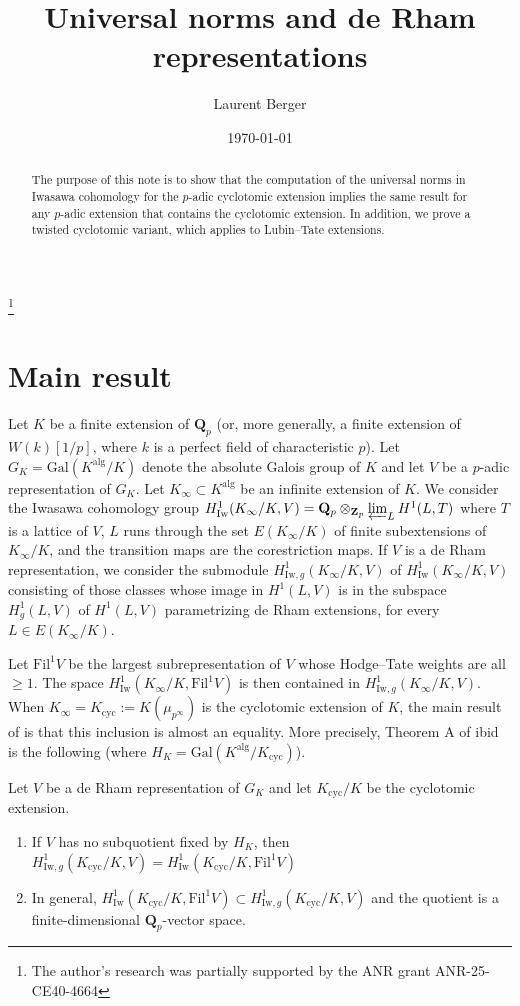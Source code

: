 \documentclass[12pt,english,a4paper]{smfart}
\author{Laurent Berger}
\title{Universal norms and de Rham representations}
\newcommand{\Qp}{\mathbf{Q}_p}
\newcommand{\Zp}{\mathbf{Z}_p}
\renewcommand{\projlim}{\varprojlim}
\newcommand{\Gal}{\mathrm{Gal}}
\newcommand{\Iw}{\mathrm{Iw}}
\newcommand{\Fil}{\mathrm{Fil}}
\newcommand{\alg}{\mathrm{alg}}
\newcommand{\cyc}{\mathrm{cyc}}
\begin{document}
\begin{abstract}
The purpose of this note is to show that the computation of the universal norms in Iwasawa cohomology for the $p$-adic cyclotomic extension implies the same result for any $p$-adic extension that contains the cyclotomic extension. In addition, we prove a twisted cyclotomic variant, which applies to Lubin--Tate extensions.
\end{abstract}

\date{\today}

\thanks{The author's research was partially supported by the ANR grant ANR-25-CE40-4664}

\maketitle

\setlength{\baselineskip}{17pt}

\section{Main result}

Let $K$ be a finite extension of $\Qp$ (or, more generally, a finite extension of $W(k)[1/p]$, where $k$ is a perfect field of characteristic $p$). Let $G_K = \Gal(K^{\alg}/K)$ denote the absolute Galois group of $K$ and let $V$ be a $p$-adic representation of $G_K$. Let $K_\infty \subset K^{\alg}$ be an infinite extension of $K$. We consider the Iwasawa cohomology group $H^1_{\Iw}(K_\infty/K,V) = \Qp \otimes_{\Zp} \projlim_L H^1(L,T)$ where $T$ is a lattice of $V$, $L$ runs through the set $E(K_\infty/K)$ of finite subextensions of $K_\infty/K$, and the transition maps are the corestriction maps. If $V$ is a de Rham representation, we consider the submodule $H^1_{\Iw,g}(K_\infty/K,V)$ of $H^1_{\Iw}(K_\infty/K,V)$ consisting of those classes whose image in $H^1(L,V)$ is in the subspace $H^1_g(L,V)$ of $H^1(L,V)$ parametrizing de Rham extensions, for every $L \in E(K_\infty/K)$. 

Let $\Fil^1 V$ be the largest subrepresentation of $V$ whose Hodge--Tate weights are all $\geq 1$. The space $H^1_{\Iw}(K_\infty/K,\Fil^1 V)$ is then contained in $H^1_{\Iw,g}(K_\infty/K,V)$. When $K_\infty = K_{\cyc} := K( \mu_{p^\infty} )$ is the cyclotomic extension of $K$, the main result of \cite{Ber05} is that this inclusion is almost an equality. More precisely, Theorem A of ibid is the following 
(where $H_K = \Gal(K^{\alg}/K_{\cyc})$).

\begin{theo}
\label{theoA}
Let $V$ be a de Rham representation of $G_K$ and let $K_{\cyc}/K$ be the cyclotomic extension.
\begin{enumerate}
\item If $V$ has no subquotient fixed by $H_K$, then $H^1_{\Iw,g}(K_{\cyc}/K,V) = H^1_{\Iw}(K_{\cyc}/K,\Fil^1 V) $
\item In general, $H^1_{\Iw}(K_{\cyc}/K,\Fil^1 V) \subset H^1_{\Iw,g}(K_{\cyc}/K,V)$ and the quotient is a finite-dimensional $\Qp$-vector space.
\end{enumerate}
\end{theo}
\end{document}

